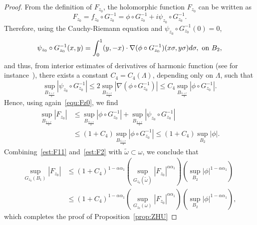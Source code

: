 \documentclass[a4paper,reqno]{amsart}
\theoremstyle{definition}
\numberwithin{equation}{section}
\def \d {{\rm{d}}}
\begin{document}
\begin{proof}
        From the definition of $F_{z_{0}}$, the holomorphic function $F_{z_{0}}$ can be written as 
        \begin{equation}\label{equ:Fz0}
            F_{z_{0}}=f_{z_{0}}\circ G_{z_{0}}^{-1}=\phi\circ G_{z_{0}}^{-1}+i\psi_{z_{0}}\circ G_{z_{0}}^{-1}.
        \end{equation}
        Therefore, using the Cauchy-Riemann equation and $\psi_{z_{0}}\circ G_{z_{0}}^{-1}(0)=0$,
        \begin{equation*}
            \psi_{z_{0}}\circ G_{z_{0}}^{-1}(x,y)=\int_{0}^{1}(y,-x)\cdot\nabla(\phi\circ G_{z_{0}}^{-1})(x\sigma,y\sigma)\d \sigma,\ \mbox{on}\ B_{2},
        \end{equation*}
        and thus, from interior estimates of derivatives of harmonic function (see for instance~\cite[Theorem 2.10]{GN}), there exists a constant $C_{4}=C_{4}(\Lambda)$, depending only on $\Lambda$, such that 
        \begin{equation*}
            \sup_{B_{\frac{2+r}{2}}} \left|\psi_{z_{0}}\circ G_{z_{0}}^{-1} \right|
            \le 2\sup_{B_{\frac{2+r}{2}}} \left|\nabla (\phi\circ G_{z_{0}}^{-1}) \right|\le C_{4}\sup_{B_{\frac{6+r}{4}}}
            \left| \phi\circ G_{z_{0}}^{-1} \right| .          \end{equation*}
            Hence, using again~\eqref{equ:Fz0}, we find
            \begin{equation}\label{est:F2}
            \begin{aligned}
                \sup_{B_{\frac{2+r}{2}}}|F_{z_{0}}|
                &\le 
                \sup_{B_{\frac{2+r}{2}}}|\phi\circ G_{z_{0}}^{-1}|+
                 \sup_{B_{\frac{2+r}{2}}}|\psi_{z_{0}}\circ G_{z_{0}}^{-1}| \\
                & \le (1+C_{4})\sup_{B_{\frac{6+r}{4}}}
            \left| \phi\circ G_{z_{0}}^{-1} \right|
            \le (1+C_{4})\sup_{B_{2}}|\phi|.    
            \end{aligned}
            \end{equation}
            Combining~\eqref{est:F11} and~\eqref{est:F2} with $\widetilde{\omega}\subset \omega$, we conclude that
            \begin{equation*}
            \begin{aligned}
                \sup_{G_{z_{0}}(B_{1})}|F_{z_{0}}|
                &\le 
                (1+C_{4})^{1-\alpha\alpha_{1}}\left(\sup_{G_{z_{0}}(\widetilde{\omega})}|F_{z_{0}}|^{\alpha\alpha_{1}}\right)
                \left(\sup_{B_{2}}|\phi|^{1-\alpha\alpha_{1}}\right)\\
                &\le (1+C_{4})^{1-\alpha\alpha_{1}}\left(\sup_{G_{z_{0}}({\omega})}|F_{z_{0}}|^{\alpha\alpha_{1}}\right)
                \left(\sup_{B_{2}}|\phi|^{1-\alpha\alpha_{1}}\right),                \end{aligned}
            \end{equation*}
            which completes the proof of Proposition~\ref{prop:ZHU}
        \end{proof}
\end{document}
